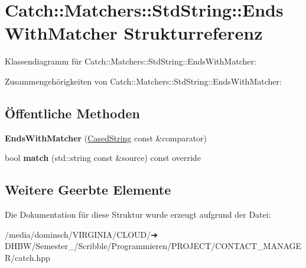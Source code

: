 \hypertarget{structCatch_1_1Matchers_1_1StdString_1_1EndsWithMatcher}{}\section{Catch\+:\+:Matchers\+:\+:Std\+String\+:\+:Ends\+With\+Matcher Strukturreferenz}
\label{structCatch_1_1Matchers_1_1StdString_1_1EndsWithMatcher}


Klassendiagramm für Catch\+:\+:Matchers\+:\+:Std\+String\+:\+:Ends\+With\+Matcher\+:


Zusammengehörigkeiten von Catch\+:\+:Matchers\+:\+:Std\+String\+:\+:Ends\+With\+Matcher\+:
\subsection*{Öffentliche Methoden}
\begin{DoxyCompactItemize}
\item 
\mbox{\label{structCatch_1_1Matchers_1_1StdString_1_1EndsWithMatcher_aa5ec700b4629562f74f362080accfd7b}} 
{\bfseries Ends\+With\+Matcher} (\hyperlink{structCatch_1_1Matchers_1_1StdString_1_1CasedString}{Cased\+String} const \&comparator)
\item 
\mbox{\label{structCatch_1_1Matchers_1_1StdString_1_1EndsWithMatcher_aca2741fa57374a2a98d2a84ac3e13a6d}} 
bool {\bfseries match} (std\+::string const \&source) const override
\end{DoxyCompactItemize}
\subsection*{Weitere Geerbte Elemente}


Die Dokumentation für diese Struktur wurde erzeugt aufgrund der Datei\+:\begin{DoxyCompactItemize}
\item 
/media/dominsch/\+V\+I\+R\+G\+I\+N\+I\+A/\+C\+L\+O\+U\+D/➔ D\+H\+B\+W/\+Semester\+\_/\+Scribble/\+Programmieren/\+P\+R\+O\+J\+E\+C\+T/\+C\+O\+N\+T\+A\+C\+T\+\_\+\+M\+A\+N\+A\+G\+E\+R/catch.\+hpp\end{DoxyCompactItemize}
